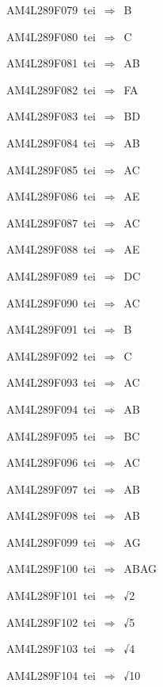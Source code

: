 {\sixrm AM4L289F079\ {\sixit tei}\ }$\Rightarrow$\ B\par\smallskip
{\sixrm AM4L289F080\ {\sixit tei}\ }$\Rightarrow$\ C\par\smallskip
{\sixrm AM4L289F081\ {\sixit tei}\ }$\Rightarrow$\ AB\par\smallskip
{\sixrm AM4L289F082\ {\sixit tei}\ }$\Rightarrow$\ FA\par\smallskip
{\sixrm AM4L289F083\ {\sixit tei}\ }$\Rightarrow$\ BD\par\smallskip
{\sixrm AM4L289F084\ {\sixit tei}\ }$\Rightarrow$\ AB\par\smallskip
{\sixrm AM4L289F085\ {\sixit tei}\ }$\Rightarrow$\ AC\par\smallskip
{\sixrm AM4L289F086\ {\sixit tei}\ }$\Rightarrow$\ AE\par\smallskip
{\sixrm AM4L289F087\ {\sixit tei}\ }$\Rightarrow$\ AC\par\smallskip
{\sixrm AM4L289F088\ {\sixit tei}\ }$\Rightarrow$\ AE\par\smallskip
{\sixrm AM4L289F089\ {\sixit tei}\ }$\Rightarrow$\ DC\par\smallskip
{\sixrm AM4L289F090\ {\sixit tei}\ }$\Rightarrow$\ AC\par\smallskip
{\sixrm AM4L289F091\ {\sixit tei}\ }$\Rightarrow$\ B\par\smallskip
{\sixrm AM4L289F092\ {\sixit tei}\ }$\Rightarrow$\ C\par\smallskip
{\sixrm AM4L289F093\ {\sixit tei}\ }$\Rightarrow$\ AC\par\smallskip
{\sixrm AM4L289F094\ {\sixit tei}\ }$\Rightarrow$\ AB\par\smallskip
{\sixrm AM4L289F095\ {\sixit tei}\ }$\Rightarrow$\ BC\par\smallskip
{\sixrm AM4L289F096\ {\sixit tei}\ }$\Rightarrow$\ AC\par\smallskip
{\sixrm AM4L289F097\ {\sixit tei}\ }$\Rightarrow$\ AB\par\smallskip
{\sixrm AM4L289F098\ {\sixit tei}\ }$\Rightarrow$\ AB\par\smallskip
{\sixrm AM4L289F099\ {\sixit tei}\ }$\Rightarrow$\ AG\par\smallskip
{\sixrm AM4L289F100\ {\sixit tei}\ }$\Rightarrow$\ ABAG\par\smallskip
{\sixrm AM4L289F101\ {\sixit tei}\ }$\Rightarrow$\ √2\par\smallskip
{\sixrm AM4L289F102\ {\sixit tei}\ }$\Rightarrow$\ √5\par\smallskip
{\sixrm AM4L289F103\ {\sixit tei}\ }$\Rightarrow$\ √4\par\smallskip
{\sixrm AM4L289F104\ {\sixit tei}\ }$\Rightarrow$\ √10\par\smallskip

